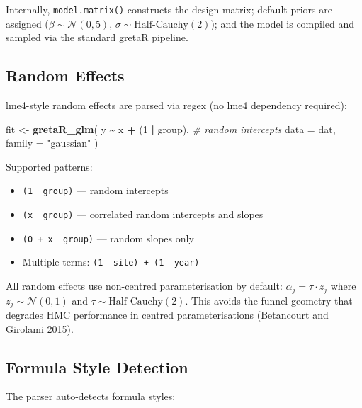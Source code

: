 \documentclass[
  11pt,
]{article}
\newenvironment{Shaded}{\begin{snugshade}}{\end{snugshade}}
\newcommand{\AttributeTok}[1]{\textcolor[rgb]{0.13,0.29,0.53}{#1}}
\newcommand{\CommentTok}[1]{\textcolor[rgb]{0.56,0.35,0.01}{\textit{#1}}}
\newcommand{\DecValTok}[1]{\textcolor[rgb]{0.00,0.00,0.81}{#1}}
\newcommand{\FunctionTok}[1]{\textcolor[rgb]{0.13,0.29,0.53}{\textbf{#1}}}
\newcommand{\NormalTok}[1]{#1}
\newcommand{\OtherTok}[1]{\textcolor[rgb]{0.56,0.35,0.01}{#1}}
\newcommand{\SpecialCharTok}[1]{\textcolor[rgb]{0.81,0.36,0.00}{\textbf{#1}}}
\newcommand{\StringTok}[1]{\textcolor[rgb]{0.31,0.60,0.02}{#1}}
\providecommand{\tightlist}{%
  \setlength{\itemsep}{0pt}\setlength{\parskip}{0pt}}
\begin{document}
Internally, \texttt{model.matrix()} constructs the design matrix;
default priors are assigned (\(\beta \sim \mathcal{N}(0, 5)\),
\(\sigma \sim \text{Half-Cauchy}(2)\)); and the model is compiled and
sampled via the standard gretaR pipeline.

\subsection{Random Effects}\label{random-effects}

lme4-style random effects are parsed via regex (no lme4 dependency
required):

\begin{Shaded}
\begin{Highlighting}[]
\NormalTok{fit }\OtherTok{\textless{}{-}} \FunctionTok{gretaR\_glm}\NormalTok{(}
\NormalTok{  y }\SpecialCharTok{\textasciitilde{}}\NormalTok{ x }\SpecialCharTok{+}\NormalTok{ (}\DecValTok{1} \SpecialCharTok{|}\NormalTok{ group),        }\CommentTok{\# random intercepts}
  \AttributeTok{data =}\NormalTok{ dat,}
  \AttributeTok{family =} \StringTok{"gaussian"}
\NormalTok{)}
\end{Highlighting}
\end{Shaded}

Supported patterns:

\begin{itemize}
\tightlist
\item
  \texttt{(1\ \textbar{}\ group)} --- random intercepts
\item
  \texttt{(x\ \textbar{}\ group)} --- correlated random intercepts and
  slopes
\item
  \texttt{(0\ +\ x\ \textbar{}\ group)} --- random slopes only
\item
  Multiple terms:
  \texttt{(1\ \textbar{}\ site)\ +\ (1\ \textbar{}\ year)}
\end{itemize}

All random effects use non-centred parameterisation by default:
\(\alpha_j = \tau \cdot z_j\) where \(z_j \sim \mathcal{N}(0, 1)\) and
\(\tau \sim \text{Half-Cauchy}(2)\). This avoids the funnel geometry
that degrades HMC performance in centred parameterisations (Betancourt
and Girolami 2015).

\subsection{Formula Style Detection}\label{formula-style-detection}

The parser auto-detects formula styles:
\end{document}
